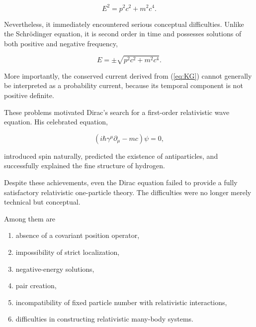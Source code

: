 \begin{equation}
E^2
=
p^2c^2+m^2c^4.
\label{eq:EinsteinEnergy}
\end{equation}

Nevertheless, it immediately encountered serious conceptual difficulties.
Unlike the Schrödinger equation, it is second order in time and possesses
solutions of both positive and negative frequency,

\begin{equation}
E=\pm\sqrt{p^2c^2+m^2c^4}.
\end{equation}

More importantly, the conserved current derived from
(\ref{eq:KG}) cannot generally be interpreted as a probability current,
because its temporal component is not positive definite.

These problems motivated Dirac's search for a first-order relativistic wave
equation. His celebrated equation,

\begin{equation}
(i\hbar\gamma^\mu\partial_\mu-mc)\psi=0,
\label{eq:Dirac}
\end{equation}

introduced spin naturally, predicted the existence of antiparticles,
and successfully explained the fine structure of hydrogen.

Despite these achievements, even the Dirac equation failed to provide a fully
satisfactory relativistic one-particle theory. The difficulties were no longer
merely technical but conceptual.

Among them are

\begin{enumerate}

\item absence of a covariant position operator,

\item impossibility of strict localization,

\item negative-energy solutions,

\item pair creation,

\item incompatibility of fixed particle number with relativistic interactions,

\item difficulties in constructing relativistic many-body systems.

\end{enumerate}

